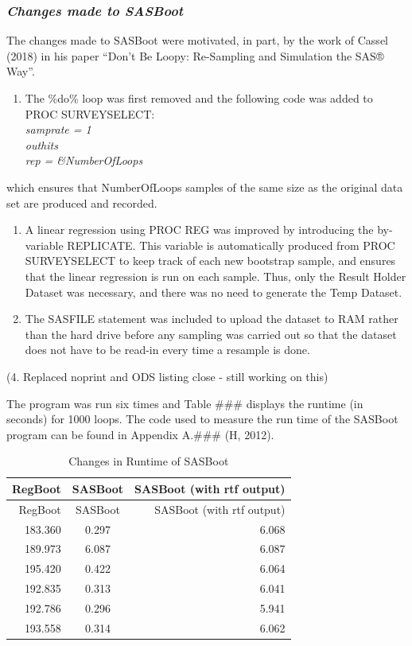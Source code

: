 \documentclass[]{article}
\providecommand{\tightlist}{%
  \setlength{\itemsep}{0pt}\setlength{\parskip}{0pt}}
\begin{document}
\subsubsection{\texorpdfstring{\emph{Changes made to
SASBoot}}{Changes made to SASBoot}}\label{changes-made-to-sasboot}

The changes made to SASBoot were motivated, in part, by the work of
Cassel (2018) in his paper ``Don't Be Loopy: Re-Sampling and Simulation
the SAS® Way''.

\begin{enumerate}
\def\labelenumi{\arabic{enumi}.}
\tightlist
\item
  The \%do\% loop was first removed and the following code was added to
  PROC SURVEYSELECT:\\
  \emph{samprate = 1}\\
  \emph{outhits}\\
  \emph{rep = \&NumberOfLoops}
\end{enumerate}

which ensures that NumberOfLoops samples of the same size as the
original data set are produced and recorded.

\begin{enumerate}
\def\labelenumi{\arabic{enumi}.}
\setcounter{enumi}{1}
\item
  A linear regression using PROC REG was improved by introducing the
  by-variable REPLICATE. This variable is automatically produced from
  PROC SURVEYSELECT to keep track of each new bootstrap sample, and
  ensures that the linear regression is run on each sample. Thus, only
  the Result Holder Dataset was necessary, and there was no need to
  generate the Temp Dataset.
\item
  The SASFILE statement was included to upload the dataset to RAM rather
  than the hard drive before any sampling was carried out so that the
  dataset does not have to be read-in every time a resample is done.
\end{enumerate}

(4. Replaced noprint and ODS listing close - still working on this)

The program was run six times and Table \#\#\# displays the runtime (in
seconds) for 1000 loops. The code used to measure the run time of the
SASBoot program can be found in Appendix A.\#\#\# (H, 2012).

\begin{longtable}[]{@{}rcr@{}}
\caption{Changes in Runtime of SASBoot}\tabularnewline
\toprule
RegBoot & SASBoot & SASBoot (with rtf output)\tabularnewline
\midrule
\endfirsthead
\toprule
RegBoot & SASBoot & SASBoot (with rtf output)\tabularnewline
\midrule
\endhead
183.360 & 0.297 & 6.068\tabularnewline
189.973 & 6.087 & 6.087\tabularnewline
195.420 & 0.422 & 6.064\tabularnewline
192.835 & 0.313 & 6.041\tabularnewline
192.786 & 0.296 & 5.941\tabularnewline
193.558 & 0.314 & 6.062\tabularnewline
\bottomrule
\end{longtable}
\end{document}
